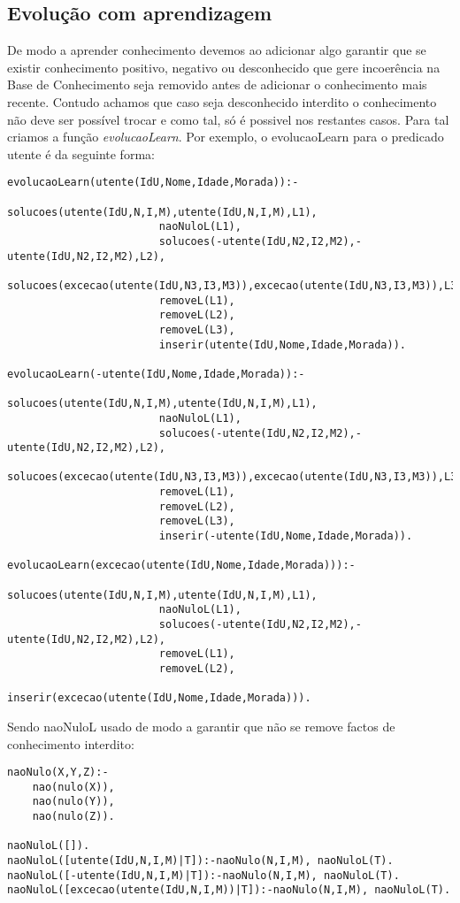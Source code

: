 \documentclass{article}
\begin{document}
\subsection{Evolução com aprendizagem}
De modo a aprender conhecimento devemos ao adicionar algo garantir que se existir conhecimento positivo, negativo ou desconhecido que gere incoerência na Base de Conhecimento seja removido antes de adicionar o conhecimento mais recente. Contudo achamos que caso seja desconhecido interdito o conhecimento não deve ser possível trocar e como tal, só é possivel nos restantes casos. Para tal criamos a função \textit{evolucaoLearn}. Por exemplo, o evolucaoLearn para o predicado utente é da seguinte forma:
\begin{verbatim}
evolucaoLearn(utente(IdU,Nome,Idade,Morada)):-
                        solucoes(utente(IdU,N,I,M),utente(IdU,N,I,M),L1),
                        naoNuloL(L1),
                        solucoes(-utente(IdU,N2,I2,M2),-utente(IdU,N2,I2,M2),L2),
                        solucoes(excecao(utente(IdU,N3,I3,M3)),excecao(utente(IdU,N3,I3,M3)),L3),
                        removeL(L1),
                        removeL(L2),
                        removeL(L3),
                        inserir(utente(IdU,Nome,Idade,Morada)).

evolucaoLearn(-utente(IdU,Nome,Idade,Morada)):-
                        solucoes(utente(IdU,N,I,M),utente(IdU,N,I,M),L1),
                        naoNuloL(L1),
                        solucoes(-utente(IdU,N2,I2,M2),-utente(IdU,N2,I2,M2),L2),
                        solucoes(excecao(utente(IdU,N3,I3,M3)),excecao(utente(IdU,N3,I3,M3)),L3),
                        removeL(L1),
                        removeL(L2),
                        removeL(L3),
                        inserir(-utente(IdU,Nome,Idade,Morada)).

evolucaoLearn(excecao(utente(IdU,Nome,Idade,Morada))):-
                        solucoes(utente(IdU,N,I,M),utente(IdU,N,I,M),L1),
                        naoNuloL(L1),
                        solucoes(-utente(IdU,N2,I2,M2),-utente(IdU,N2,I2,M2),L2),
                        removeL(L1),
                        removeL(L2),
                        inserir(excecao(utente(IdU,Nome,Idade,Morada))).
\end{verbatim}
Sendo naoNuloL usado de modo a garantir que não se remove factos de conhecimento interdito:
\begin{verbatim}
naoNulo(X,Y,Z):-
    nao(nulo(X)),
    nao(nulo(Y)),
    nao(nulo(Z)).

naoNuloL([]).
naoNuloL([utente(IdU,N,I,M)|T]):-naoNulo(N,I,M), naoNuloL(T).
naoNuloL([-utente(IdU,N,I,M)|T]):-naoNulo(N,I,M), naoNuloL(T).
naoNuloL([excecao(utente(IdU,N,I,M))|T]):-naoNulo(N,I,M), naoNuloL(T).
\end{verbatim}
\end{document}
